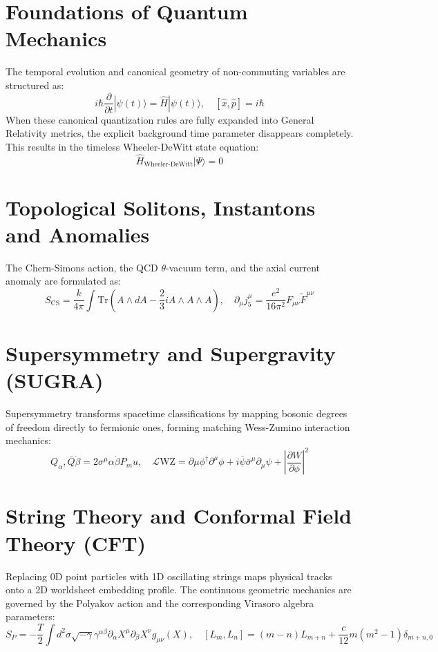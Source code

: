 \documentclass[11pt,a4paper]{article}
\begin{document}
\section{Foundations of Quantum Mechanics}
The temporal evolution and canonical geometry of non-commuting variables are structured as:
\begin{equation}
i\hbar \frac{\partial}{\partial t}|\psi(t)\rangle = \hat{H}|\psi(t)\rangle, \quad [\hat{x}, \hat{p}] = i\hbar
\end{equation}
When these canonical quantization rules are fully expanded into General Relativity metrics, the explicit background time parameter disappears completely. This results in the timeless Wheeler-DeWitt state equation:
\begin{equation}
\hat{H}_{\text{Wheeler-DeWitt}}|\Psi\rangle = 0
\end{equation}
\section{Topological Solitons, Instantons and Anomalies}
The Chern-Simons action, the QCD $\theta$-vacuum term, and the axial current anomaly are formulated as:
\begin{equation}
S_{\text{CS}} = \frac{k}{4\pi} \int \text{Tr}\left(A \wedge dA - \frac{2}{3}i A \wedge A \wedge A\right), \quad \partial_\mu j^\mu_5 = \frac{e^2}{16\pi^2} F_{\mu\nu}\tilde{F}^{\mu\nu}
\end{equation}
\section{Supersymmetry and Supergravity (SUGRA)}
Supersymmetry transforms spacetime classifications by mapping bosonic degrees of freedom directly to fermionic ones, forming matching Wess-Zumino interaction mechanics:
\begin{equation}
{Q_\alpha, \bar{Q}{\dot{\beta}}} = 2\sigma^\mu{\alpha\dot{\beta}} P_mu, \quad \mathcal{L}{\text{WZ}} = \partial{\mu} \phi^\dagger \partial^\mu \phi + i\bar{\psi}\bar{\sigma}^\mu \partial_\mu \psi + \left|\frac{\partial W}{\partial \phi}\right|^2
\end{equation}
\section{String Theory and Conformal Field Theory (CFT)}
Replacing 0D point particles with 1D oscillating strings maps physical tracks onto a 2D worldsheet embedding profile. The continuous geometric mechanics are governed by the Polyakov action and the corresponding Virasoro algebra parameters:
\begin{equation}
S_P = -\frac{T}{2} \int d^2\sigma \sqrt{-\gamma}\gamma^{\alpha\beta}\partial_\alpha X^\mu \partial_\beta X^\nu g_{\mu\nu}(X), \quad [L_m, L_n] = (m-n)L_{m+n} + \frac{c}{12}m(m^2-1)\delta_{m+n,0}
\end{equation}
\end{document}
